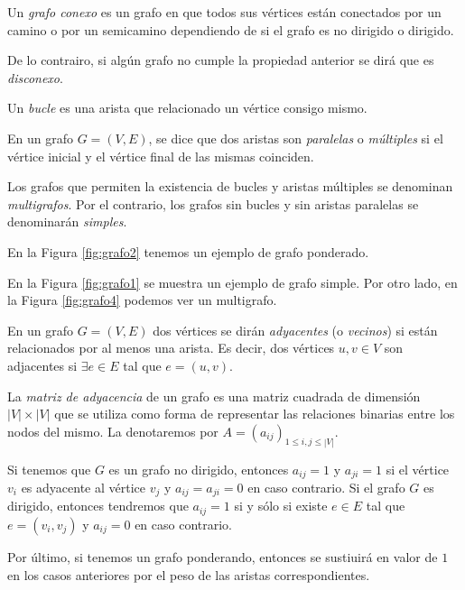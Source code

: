 \begin{definition}
Un \emph{grafo conexo} es un grafo en que todos sus vértices están conectados por un camino o por un semicamino dependiendo de si el grafo es no dirigido o dirigido.

De lo contrairo, si algún grafo no cumple la propiedad anterior se dirá que es \emph{disconexo}.
\end{definition}

\begin{definition}
Un \emph{bucle} es una arista que relacionado un vértice consigo mismo.
\end{definition}

\begin{definition}
En un grafo $G=(V,E)$, se dice que dos aristas son \emph{paralelas} o \emph{múltiples} si el vértice inicial y el vértice final de las mismas coinciden. 

Los grafos que permiten la existencia de bucles y aristas múltiples se denominan \emph{multigrafos}. Por el contrario, los grafos sin bucles y sin aristas paralelas se denominarán \emph{simples}.
\end{definition}

\begin{exampleth}
En la Figura \ref{fig:grafo2} tenemos un ejemplo de grafo ponderado.

En la Figura \ref{fig:grafo1} se muestra un ejemplo de grafo simple. Por otro lado, en la Figura \ref{fig:grafo4} podemos ver un multigrafo.
\end{exampleth}

\begin{definition}
En un grafo $G=(V,E)$ dos vértices se dirán \emph{adyacentes} (o \emph{vecinos}) si están relacionados por al menos una arista. Es decir, dos vértices $u,v \in V$ son adjacentes si $\exists e \in E$ tal que $e = (u,v)$.

La \emph{matriz de adyacencia} de un grafo es una matriz cuadrada de dimensión $|V| \times |V|$ que se utiliza como forma de representar las relaciones binarias entre los nodos del mismo. La denotaremos por $A = (a_{ij})_{1\leq i,j\leq |V|}$.

Si tenemos que $G$ es un grafo no dirigido, entonces $a_{ij} = 1$ y $a_{ji} = 1$ si el vértice $v_i$ es adyacente al vértice $v_j$ y $a_{ij} = a_{ji} = 0$ en caso contrario. Si el grafo $G$ es dirigido, entonces tendremos que $a_{ij} = 1$ si y sólo si existe $e \in E$ tal que $e = (v_i,v_j)$ y $a_{ij} = 0$ en caso contrario.

Por último, si tenemos un grafo ponderando, entonces se sustiuirá en valor de $1$ en los casos anteriores por el peso de las aristas correspondientes.
\end{definition}

